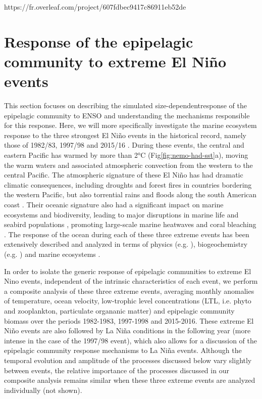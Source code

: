 https://fr.overleaf.com/project/607fdbec9417c86911eb52de\section{Response of the epipelagic community to extreme El Niño events}
\label{sec:nino-epi}

This section focuses on describing the simulated size-dependentresponse of the epipelagic community to ENSO and understanding the mechanisms responsible for this response. Here, we will more specifically investigate the marine ecosystem response to the three strongest El Niño events in the historical record, namely those of 1982/83, 1997/98 and 2015/16 \citep{santosoDefiningCharacteristicsENSO2017}. During these events, the central and eastern Pacific has warmed by more than 2°C (Fig\ref{fig:nemo-had-sst}a), moving the warm waters and associated atmospheric convection from the western to the central Pacific. The atmospheric signature of these El Niño has had dramatic climatic consequences, including droughts and forest fires in countries bordering the western Pacific, but also torrential rains and floods along the south American coast \citep{caiClimateImpactsNino2020}. Their oceanic signature also had a significant impact on marine ecosystems and biodiversity, leading to major disruptions in marine life and seabird populations \citep{valleImpact198219831987}, promoting large-scale marine heatwaves \citep{holbrookKeepingPaceMarine2020} and coral bleaching \citep{claarGlobalPatternsImpacts2018}.  The response of the ocean during each of these three extreme events has been extensively described and analyzed in terms of physics (e.g. \citealp{philanderChapter33Simulation1985, lengaigneOceanResponseMarch2002, puyModulationEquatorialPacific2019}), biogeochemistry (e.g. \citealp{barberBiologicalConsequencesNino1983, chavezBiologicalChemicalResponse1999, strammaObservedNinoConditions2016}) and marine ecosystems \citep{glynnNINOSOUTHERNOSCILLATION198219831988, glynnCoralBleachingMortality2001, eakin20142017Globalscale2019}. 

In order to isolate the generic response of epipelagic communities to extreme El Nino events, independent of the intrinsic characteristics of each event, we perform a composite analysis of these three extreme events, averaging monthly anomalies of temperature, ocean velocity, low-trophic level concentrations (LTL, i.e. phyto and zooplankton, particulate organanic matter) and epipelagic community biomass over the periods 1982-1983, 1997-1998 and 2015-2016. These extreme El Niño events are also followed by La Niña conditions in the following year (more intense in the case of the 1997/98 event), which also allows for a discussion  of the epipelagic community response mechanisms to La Niña events. Although the temporal evolution and amplitude of the processes discussed below vary slightly between events, the relative importance of the processes discussed in our composite analysis remains similar when these three extreme events are analyzed individually (not shown). 

